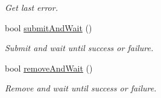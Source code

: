 \begin{DoxyCompactItemize}
\begin{DoxyCompactList}\small\item\em Get last error. \end{DoxyCompactList}\item 
bool \hyperlink{classmdt_abstract_sql_table_controller_ab1d75ed2eb77baf4324cea09e281c91e}{submit\-And\-Wait} ()
\begin{DoxyCompactList}\small\item\em Submit and wait until success or failure. \end{DoxyCompactList}\item 
bool \hyperlink{classmdt_abstract_sql_table_controller_a066b7b828b6249b7ac2431d6d57c234d}{remove\-And\-Wait} ()
\begin{DoxyCompactList}\small\item\em Remove and wait until success or failure. \end{DoxyCompactList}\end{DoxyCompactItemize}

